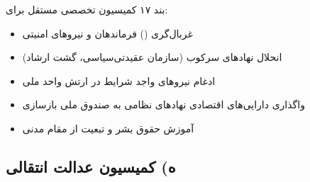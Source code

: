 \begin{bandbox}{بند ۱۷}
	کمیسیون تخصصی مستقل برای:
	\begin{itemize}
		\item غربال‌گری () فرماندهان و نیروهای امنیتی
		\item انحلال نهادهای سرکوب (سازمان عقیدتی‌سیاسی، گشت ارشاد)
		\item ادغام نیروهای واجد شرایط در ارتش واحد ملی
		\item واگذاری دارایی‌های اقتصادی نهادهای نظامی به صندوق ملی بازسازی
		\item آموزش حقوق بشر و تبعیت از مقام مدنی
	\end{itemize}
\end{bandbox}

\subsection{ه) کمیسیون عدالت انتقالی}

